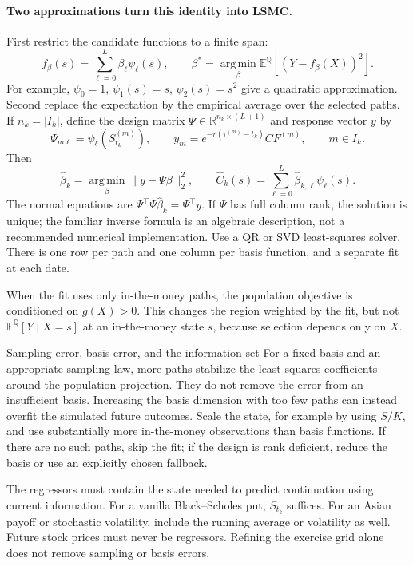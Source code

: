 \documentclass[10pt]{article}
\newcommand{\E}{\mathbb E}
\newcommand{\Q}{\mathbb Q}
\newcommand{\R}{\mathbb R}
\newcommand{\1}{\mathbf 1}
\theoremstyle{definition}
\begin{document}
\paragraph{Two approximations turn this identity into LSMC.}
First restrict the candidate functions to a finite span:
\[
f_\beta(s)=\sum_{\ell=0}^L\beta_\ell\psi_\ell(s),\qquad
\beta^*=\operatorname*{arg\,min}_{\beta}
\E^\Q\!\left[\left(Y-f_\beta(X)\right)^2\right].
\]
For example, \(\psi_0=1\), \(\psi_1(s)=s\), \(\psi_2(s)=s^2\) give a
quadratic approximation. Second replace the expectation by the empirical
average over the selected paths. If \(n_k=|I_k|\), define the design matrix
\(\Psi\in\R^{n_k\times(L+1)}\) and response vector \(y\) by
\[
\Psi_{m\ell}=\psi_\ell(S^{(m)}_{t_k}),\qquad
y_m=e^{-r(\tau^{(m)}-t_k)}CF^{(m)},\qquad m\in I_k.
\]
Then
\[
\boxed{\widehat\beta_k=\operatorname*{arg\,min}_{\beta}\|y-\Psi\beta\|_2^2,
\qquad \widehat C_k(s)=\sum_{\ell=0}^L\widehat\beta_{k,\ell}\psi_\ell(s).}
\]
The normal equations are
\(\Psi^\top\Psi\widehat\beta_k=\Psi^\top y\). If \(\Psi\) has full
column rank, the solution is unique; the familiar inverse formula is an
algebraic description, not a recommended numerical implementation.
Use a QR or SVD least-squares solver. There is one row per path and one
column per basis function, and a separate fit at each date.

When the fit uses only in-the-money paths, the population objective is
conditioned on \(g(X)>0\). This changes the region weighted by the fit,
but not \(\E^\Q[Y\mid X=s]\) at an in-the-money state \(s\), because
selection depends only on \(X\).

\begin{warningbox}{Sampling error, basis error, and the information set}
For a fixed basis and an appropriate sampling law, more paths stabilize the
least-squares coefficients around the population projection. They do not
remove the error from an insufficient basis. Increasing the basis dimension
with too few paths can instead overfit the simulated future outcomes.
Scale the state, for example by using \(S/K\), and use substantially more
in-the-money observations than basis functions. If there are no such paths,
skip the fit; if the design is rank deficient, reduce the basis or use an
explicitly chosen fallback.

The regressors must contain the state needed to predict continuation using
current information. For a vanilla Black--Scholes put, \(S_{t_k}\) suffices.
For an Asian payoff or stochastic volatility, include the running average
or volatility as well. Future stock prices must never be regressors.
Refining the exercise grid alone does not remove sampling or basis errors.
\end{warningbox}
\end{document}
